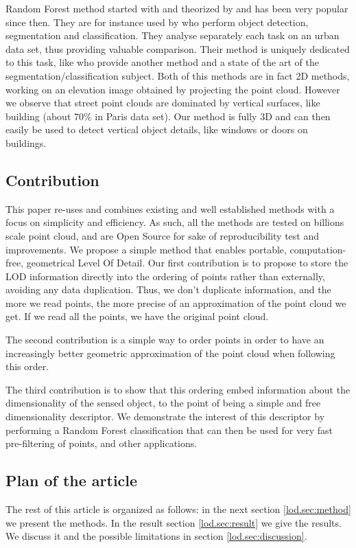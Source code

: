 		Random Forest method started with \cite{Amit97shapequantization} and theorized by \cite{Breiman2001} and has been very popular since then. They are for instance used by \cite{Golovinskiy2009} who perform object detection, segmentation and classification. They analyse separately each task on an urban data set, thus providing valuable comparison. Their method is uniquely dedicated to this task, like \cite{Serna2014} who provide another method and a state of the art of the segmentation/classification subject.
		Both of this methods are in fact 2D methods, working on an elevation image obtained by projecting the point cloud. However we observe that street point clouds are dominated by vertical surfaces, like building (about 70\% in Paris data set). Our method is fully 3D and can then easily be used to detect vertical object details, like windows or doors on buildings.
		 
	
	\subsection{Contribution}
		This paper re-uses and combines existing and well established methods with a focus on simplicity and efficiency. As such, all the methods are tested on billions scale point cloud, and are Open Source for sake of reproducibility test and improvements.
		We propose a simple method that enables portable, computation-free, geometrical Level Of Detail.
		Our first contribution is to propose to store the LOD information directly into the ordering of points rather than externally, avoiding any data duplication.
		Thus, we don't duplicate information, and the more we read points, the more precise of an approximation of the point cloud we get. If we read all the points, we have the original point cloud.
		
		The second contribution is a simple way to order points in order to have an increasingly better geometric approximation of the point cloud when following this order.
		
		The third contribution is to show that this ordering embed information about the dimensionality of the sensed object,
		to the point of being a simple and free dimensionality descriptor.
		We demonstrate the interest of this descriptor by performing a Random Forest classification that can then be used for very fast pre-filtering of points, and other applications.
			
		
	\subsection{Plan of the article}
		The rest of this article is organized as follows:
		in the next section \ref{lod.sec:method} we present the methods.  
		In the result section \ref{lod.sec:result} we give the results.
		We discuss it and the possible limitations in section \ref{lod.sec:discussion}.
		
